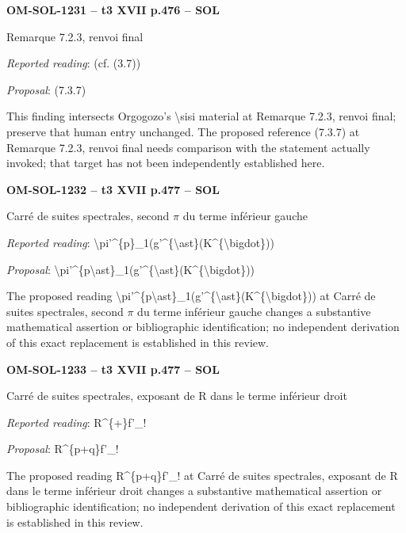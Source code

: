 \par\noindent\textbf{OM-SOL-1231 -- t3 XVII p.476 -- SOL}\par
Remarque 7.2.3, renvoi final\par
\emph{Reported reading}: (cf. (3.7))\par
\emph{Proposal}: (7.3.7)\par
This finding intersects Orgogozo's \textbackslash{}sisi material at Remarque 7.2.3, renvoi final; preserve that human entry unchanged. The proposed reference (7.3.7) at Remarque 7.2.3, renvoi final needs comparison with the statement actually invoked; that target has not been independently established here.\par
\par\noindent\textbf{OM-SOL-1232 -- t3 XVII p.477 -- SOL}\par
Carré de suites spectrales, second \ensuremath{\pi} du terme inférieur gauche\par
\emph{Reported reading}: \textbackslash{}pi'\textasciicircum{}\{p\}\_1(g'\textasciicircum{}\{\textbackslash{}ast\}(K\textasciicircum{}\{\textbackslash{}bigdot\}))\par
\emph{Proposal}: \textbackslash{}pi'\textasciicircum{}\{p\textbackslash{}ast\}\_1(g'\textasciicircum{}\{\textbackslash{}ast\}(K\textasciicircum{}\{\textbackslash{}bigdot\}))\par
The proposed reading \textbackslash{}pi'\textasciicircum{}\{p\textbackslash{}ast\}\_1(g'\textasciicircum{}\{\textbackslash{}ast\}(K\textasciicircum{}\{\textbackslash{}bigdot\})) at Carré de suites spectrales, second \ensuremath{\pi} du terme inférieur gauche changes a substantive mathematical assertion or bibliographic identification; no independent derivation of this exact replacement is established in this review.\par
\par\noindent\textbf{OM-SOL-1233 -- t3 XVII p.477 -- SOL}\par
Carré de suites spectrales, exposant de R dans le terme inférieur droit\par
\emph{Reported reading}: R\textasciicircum{}\{+\}f'\_!\par
\emph{Proposal}: R\textasciicircum{}\{p+q\}f'\_!\par
The proposed reading R\textasciicircum{}\{p+q\}f'\_! at Carré de suites spectrales, exposant de R dans le terme inférieur droit changes a substantive mathematical assertion or bibliographic identification; no independent derivation of this exact replacement is established in this review.\par
